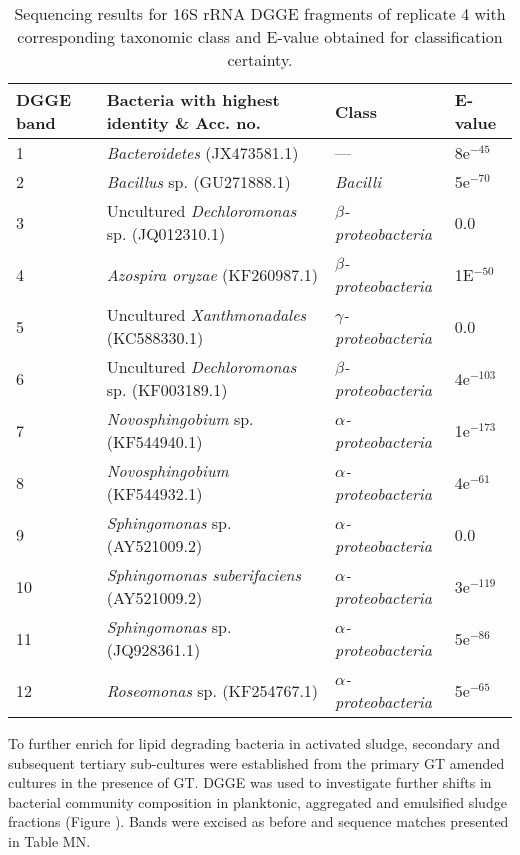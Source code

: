 \documentclass[11pt]{article}
\begin{document}
\begin{table}
\caption{Sequencing results for 16S rRNA DGGE fragments of replicate 4 with corresponding taxonomic class and E-value obtained for classification certainty.}
\begin{tabular}{ | l | p{7.8cm} | p{3cm} | l | }
\hline
DGGE band & Bacteria with highest identity \& Acc. no. & Class & E-value \\
\hline
1   &  \emph{Bacteroidetes} (JX473581.1) & --- & 8e$^{-45}$ \\
\hline
2  & \emph{Bacillus} sp. (GU271888.1) & \emph{Bacilli} & 5e$^{-70}$ \\
\hline
3 & Uncultured \emph{Dechloromonas} sp. (JQ012310.1) & \emph{$\beta$-proteobacteria} & 0.0 \\
\hline
4 & \emph{Azospira oryzae} (KF260987.1) & \emph{$\beta$-proteobacteria} & 1E$^{-50}$ \\
\hline
5 & Uncultured \emph{Xanthmonadales} (KC588330.1) & \emph{$\gamma$-proteobacteria} & 0.0 \\
\hline
6 & Uncultured \emph{Dechloromonas} sp. (KF003189.1) & \emph{$\beta$-proteobacteria} & 4e$^{-103}$ \\
\hline
7 & \emph{Novosphingobium} sp. (KF544940.1) & \emph{$\alpha$-proteobacteria} & 1e$^{-173}$ \\
\hline
8 & \emph{Novosphingobium} (KF544932.1) & \emph{$\alpha$-proteobacteria} & 4e$^{-61}$ \\
\hline
9 & \emph{Sphingomonas} sp. (AY521009.2) & \emph{$\alpha$-proteobacteria} & 0.0 \\
\hline
10 & \emph{Sphingomonas suberifaciens} (AY521009.2) & \emph{$\alpha$-proteobacteria} & 3e$^{-119}$ \\
\hline
11 & \emph{Sphingomonas} sp. (JQ928361.1) & \emph{$\alpha$-proteobacteria} & 5e$^{-86}$ \\
\hline
12 & \emph{Roseomonas} sp.  (KF254767.1) & \emph{$\alpha$-proteobacteria} & 5e$^{-65}$ \\
\hline
\end{tabular}

\end{table}
\FloatBarrier

To further enrich for lipid degrading bacteria in activated sludge, secondary and subsequent tertiary sub-cultures were established from the primary GT amended cultures in the presence of GT. DGGE was used to investigate further shifts in bacterial community composition in planktonic, aggregated and emulsified sludge fractions (Figure ). Bands were excised as before and sequence matches presented in Table MN. \\
\end{document}
